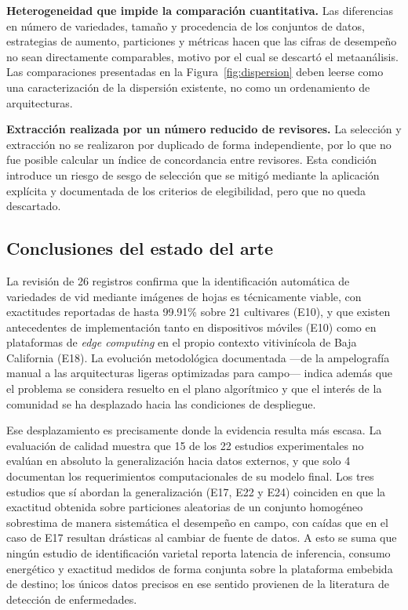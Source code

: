 \textbf{Heterogeneidad que impide la comparación cuantitativa.} Las
diferencias en número de variedades, tamaño y procedencia de los conjuntos de
datos, estrategias de aumento, particiones y métricas hacen que las cifras de
desempeño no sean directamente comparables, motivo por el cual se descartó el
metaanálisis. Las comparaciones presentadas en la Figura~\ref{fig:dispersion}
deben leerse como una caracterización de la dispersión existente, no como un
ordenamiento de arquitecturas.

\textbf{Extracción realizada por un número reducido de revisores.} La
selección y extracción no se realizaron por duplicado de forma independiente,
por lo que no fue posible calcular un índice de concordancia entre revisores.
Esta condición introduce un riesgo de sesgo de selección que se mitigó
mediante la aplicación explícita y documentada de los criterios de
elegibilidad, pero que no queda descartado.

\subsection{Conclusiones del estado del arte}

La revisión de 26 registros confirma que la identificación automática de
variedades de vid mediante imágenes de hojas es técnicamente viable, con
exactitudes reportadas de hasta 99.91\% sobre 21 cultivares (E10), y que
existen antecedentes de implementación tanto en dispositivos móviles (E10)
como en plataformas de \textit{edge computing} en el propio contexto
vitivinícola de Baja California (E18). La evolución metodológica documentada
—de la ampelografía manual a las arquitecturas ligeras optimizadas para
campo— indica además que el problema se considera resuelto en el plano
algorítmico y que el interés de la comunidad se ha desplazado hacia las
condiciones de despliegue.

Ese desplazamiento es precisamente donde la evidencia resulta más escasa. La
evaluación de calidad muestra que 15 de los 22 estudios experimentales no
evalúan en absoluto la generalización hacia datos externos, y que solo 4
documentan los requerimientos computacionales de su modelo final. Los tres
estudios que sí abordan la generalización (E17, E22 y E24) coinciden en que
la exactitud obtenida sobre particiones aleatorias de un conjunto homogéneo
sobrestima de manera sistemática el desempeño en campo, con caídas que en el
caso de E17 resultan drásticas al cambiar de fuente de datos. A esto se suma
que ningún estudio de identificación varietal reporta latencia de inferencia,
consumo energético y exactitud medidos de forma conjunta sobre la plataforma
embebida de destino; los únicos datos precisos en ese sentido provienen de la
literatura de detección de enfermedades.

